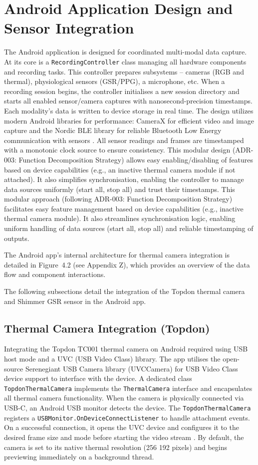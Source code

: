 \section{Android Application Design and Sensor Integration}\label{sec:4-2}
The Android application is designed for coordinated multi-modal data capture. At its core is a \texttt{RecordingController} class managing all hardware components and recording tasks. This controller prepares subsystems -- cameras (RGB and thermal), physiological sensors (GSR/PPG), a microphone, etc. When a recording session begins, the controller initialises a new session directory and starts all enabled sensor/camera captures with nanosecond-precision timestamps. Each modality's data is written to device storage in real time. The design utilizes modern Android libraries for performance: CameraX for efficient video and image capture \cite{ref13} and the Nordic BLE library for reliable Bluetooth Low Energy communication with sensors \cite{ref14}. All sensor readings and frames are timestamped with a monotonic clock source to ensure consistency. This modular design (ADR-003: Function Decomposition Strategy) allows easy enabling/disabling of features based on device capabilities (e.g., an inactive thermal camera module if not attached). It also simplifies synchronisation, enabling the controller to manage data sources uniformly (start all, stop all) and trust their timestamps. This modular approach (following ADR-003: Function Decomposition Strategy) facilitates easy feature management based on device capabilities (e.g., inactive thermal camera module). It also streamlines synchronisation logic, enabling uniform handling of data sources (start all, stop all) and reliable timestamping of outputs.

The Android app's internal architecture for thermal camera integration is detailed in Figure~4.2 (see Appendix Z), which provides an overview of the data flow and component interactions.

The following subsections detail the integration of the Topdon thermal camera and Shimmer GSR sensor in the Android app.

\subsection{Thermal Camera Integration (Topdon)}\label{sec:4-2-1}
Integrating the Topdon TC001 thermal camera on Android required using USB host mode and a UVC (USB Video Class) library. The app utilises the open-source Serenegiant USB Camera library (UVCCamera) for USB Video Class device support \cite{ref16} to interface with the device. A dedicated class \texttt{TopdonThermalCamera} implements the \texttt{ThermalCamera} interface and encapsulates all thermal camera functionality. When the camera is physically connected via USB-C, an Android USB monitor detects the device. The \texttt{TopdonThermalCamera} registers a \texttt{USBMonitor.OnDeviceConnectListener} to handle attachment events. On a successful connection, it opens the UVC device and configures it to the desired frame size and mode before starting the video stream \cite{ref16}. By default, the camera is set to its native thermal resolution (256\,\texttimes\,192 pixels) and begins previewing immediately on a background thread.

